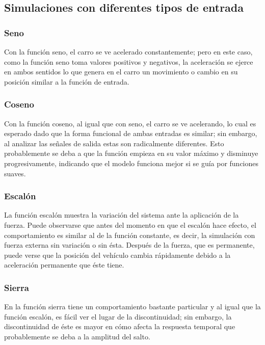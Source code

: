 \subsection{Simulaciones con diferentes tipos de entrada}
\subsubsection{Seno}
Con la función seno, el carro se ve acelerado constantemente; pero en este caso, como
la función seno toma valores positivos y negativos, la aceleración se ejerce en
ambos sentidos lo que genera en el carro un movimiento o cambio en su posición
similar a la función de entrada.

\subsubsection{Coseno}
Con la función coseno, al igual que con seno, el carro se ve acelerando,
lo cual es esperado dado que la forma funcional de ambas entradas es similar;
sin embargo, al analizar las señales de salida estas son radicalmente diferentes.
Esto probablemente se deba a que la función empieza en su valor máximo y
disminuye progresivamente, indicando que el modelo funciona mejor si se
guía por funciones suaves.

\subsubsection{Escalón}
La función escalón muestra la variación del sistema ante la aplicación de la
fuerza. Puede observarse que antes del momento en que el escalón hace efecto,
el comportamiento es similar al de la función constante, es decir, la simulación
con fuerza externa sin variación o sin ésta. Después de la fuerza, que es permanente, puede verse que la
posición del vehículo cambia rápidamente debido a la aceleración permanente
que éste tiene.

\subsubsection{Sierra}
En la función sierra tiene un comportamiento bastante particular y al igual que
la función escalón, es fácil ver el lugar de la discontinuidad; sin embargo,
la discontinuidad de éste es mayor en cómo afecta la respuesta
temporal que probablemente se deba a la amplitud del salto.
